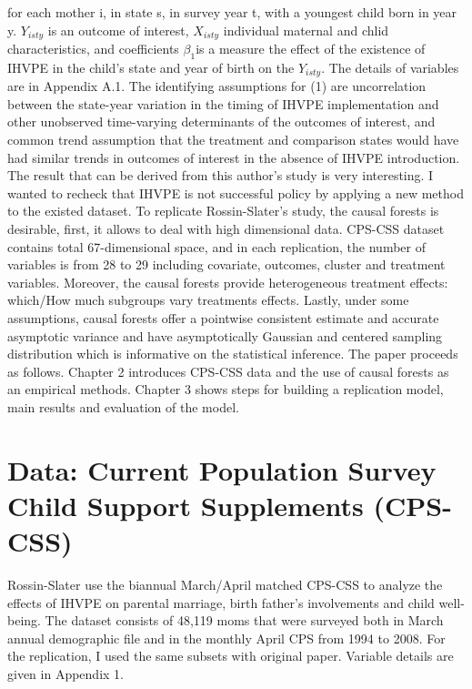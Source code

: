 \documentclass[11pt,a4paper]{article}
\begin{document}
for each mother i, in state s,
in survey year t, with a youngest child born in year y. \(Y_{isty}\) is
an outcome of interest, \(X_{isty}\) individual maternal and chlid
characteristics, and coefficients \(\beta_1\)is a measure the effect of
the existence of IHVPE in the child's state and year of birth on the
\(Y_{isty}\). The details of variables are in Appendix A.1. The
identifying assumptions for (1) are uncorrelation between the state-year
variation in the timing of IHVPE implementation and other unobserved
time-varying determinants of the outcomes of interest, and common trend
assumption that the treatment and comparison states would have had
similar trends in outcomes of interest in the absence of IHVPE
introduction. The result that can be derived from this author's study is
very interesting. I wanted to recheck that IHVPE is not successful
policy by applying a new method to the existed dataset. To replicate
Rossin-Slater's study, the causal forests is desirable, first, it allows
to deal with high dimensional data. CPS-CSS dataset contains total
67-dimensional space, and in each replication, the number of variables
is from 28 to 29 including covariate, outcomes, cluster and treatment
variables. Moreover, the causal forests provide heterogeneous treatment
effects: which/How much subgroups vary treatments effects. Lastly, under
some assumptions, causal forests offer a pointwise consistent estimate
and accurate asymptotic variance and have asymptotically Gaussian and
centered sampling distribution which is informative on the statistical
inference. The paper proceeds as follows. Chapter 2 introduces CPS-CSS
data and the use of causal forests as an empirical methods. Chapter 3
shows steps for building a replication model, main results and
evaluation of the model.

\hypertarget{data-current-population-survey-child-support-supplements-cps-css}{%
\section{Data: Current Population Survey Child Support Supplements
(CPS-CSS)}\label{data-current-population-survey-child-support-supplements-cps-css}}

Rossin-Slater use the biannual March/April matched CPS-CSS to analyze
the effects of IHVPE on parental marriage, birth father's involvements
and child well-being. The dataset consists of 48,119 moms that
were surveyed both in March annual demographic file and in the monthly
April CPS from 1994 to 2008. For the replication, I used the same
subsets with original paper. Variable details are given in Appendix 1.
\end{document}
